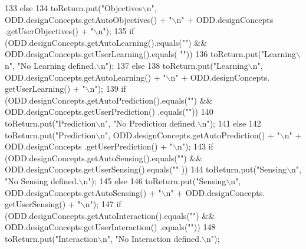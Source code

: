 \begin{DoxyCode}
133         \textcolor{keywordflow}{else}
134             toReturn.put(\textcolor{stringliteral}{"Objectives\(\backslash\)n"}, ODD.designConcepts.getAutoObjectives() + \textcolor{stringliteral}{"\(\backslash\)n"} + ODD.designConcepts
      .getUserObjectives() + \textcolor{stringliteral}{"\(\backslash\)n"});
135         \textcolor{keywordflow}{if} (ODD.designConcepts.getAutoLearning().equals(\textcolor{stringliteral}{""}) && ODD.designConcepts.getUserLearning().equals(\textcolor{stringliteral}{
      ""}))
136             toReturn.put(\textcolor{stringliteral}{"Learning\(\backslash\)n"}, \textcolor{stringliteral}{"No Learning defined.\(\backslash\)n"});
137         \textcolor{keywordflow}{else}
138             toReturn.put(\textcolor{stringliteral}{"Learning\(\backslash\)n"}, ODD.designConcepts.getAutoLearning() + \textcolor{stringliteral}{"\(\backslash\)n"} + ODD.designConcepts.
      getUserLearning() + \textcolor{stringliteral}{"\(\backslash\)n"});
139         \textcolor{keywordflow}{if} (ODD.designConcepts.getAutoPrediction().equals(\textcolor{stringliteral}{""}) && ODD.designConcepts.getUserPrediction()
      .equals(\textcolor{stringliteral}{""}))
140             toReturn.put(\textcolor{stringliteral}{"Prediction\(\backslash\)n"}, \textcolor{stringliteral}{"No Prediction defined.\(\backslash\)n"});
141         \textcolor{keywordflow}{else}
142             toReturn.put(\textcolor{stringliteral}{"Prediction\(\backslash\)n"}, ODD.designConcepts.getAutoPrediction() + \textcolor{stringliteral}{"\(\backslash\)n"} + ODD.designConcepts
      .getUserPrediction() + \textcolor{stringliteral}{"\(\backslash\)n"});
143         \textcolor{keywordflow}{if} (ODD.designConcepts.getAutoSensing().equals(\textcolor{stringliteral}{""}) && ODD.designConcepts.getUserSensing().equals(\textcolor{stringliteral}{""}
      ))
144             toReturn.put(\textcolor{stringliteral}{"Sensing\(\backslash\)n"}, \textcolor{stringliteral}{"No Sensing defined.\(\backslash\)n"});
145         \textcolor{keywordflow}{else}        
146             toReturn.put(\textcolor{stringliteral}{"Sensing\(\backslash\)n"}, ODD.designConcepts.getAutoSensing() + \textcolor{stringliteral}{"\(\backslash\)n"} + ODD.designConcepts.
      getUserSensing() + \textcolor{stringliteral}{"\(\backslash\)n"});
147         \textcolor{keywordflow}{if} (ODD.designConcepts.getAutoInteraction().equals(\textcolor{stringliteral}{""}) && ODD.designConcepts.getUserInteraction()
      .equals(\textcolor{stringliteral}{""}))
148             toReturn.put(\textcolor{stringliteral}{"Interaction\(\backslash\)n"}, \textcolor{stringliteral}{"No Interaction defined.\(\backslash\)n"});

\end{DoxyCode}
